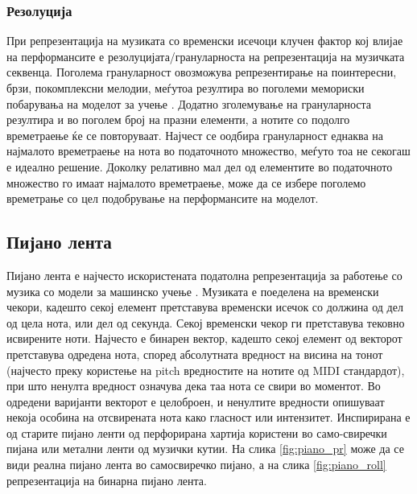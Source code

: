 \subsubsection{Резолуција}

При репрезентација на музиката со временски исечоци клучен фактор кој влијае на перформансите е резолуцијата/грануларноста на репрезентација на музичката секвенца. Поголема грануларност овозможува репрезентирање на поинтересни, брзи, покомплексни мелодии, меѓутоа резултира во поголеми мемориски побарувања на моделот за учење . Додатно зголемување на грануларноста резултира и во поголем број на празни елементи, а нотите со подолго времетраење ќе се повторуваат. Најчест се оодбира грануларност еднаква на најмалото времетраење на нота во податочното множество, меѓуто тоа не секогаш е идеално решение. Доколку релативно мал дел од елементите во податочното множество го имаат најмалото времетраење, може да се избере поголемо времетрање со цел подобрување на перформансите на моделот.

\subsection{Пијано лента}

Пијано лента е најчесто искористената податолна репрезентација за работење со музика со модели за машинско учење \cite{Hadjeres2016,Boulanger-Lewandowski2012,Boulanger-Lewandowski2014,Eck2002,Eck2008,Walder2016,Dong2017,Dong2018}. Музиката е поеделена на временски чекори, кадешто секој елемент претставува временски исечок со должина од дел од цела нота, или дел од секунда. Секој временски чекор ги претставува тековно исвирените ноти. Најчесто е бинарен вектор, кадешто секој елемент од векторот претставува одредена нота, според абсолутната вредност на висина на тонот (најчесто преку користење на pitch вредностите на нотите од MIDI стандардот), при што ненулта вредност означува дека таа нота се свири во моментот. Во одредени варијанти векторот е целоброен, и ненултите вредности опишуваат некоја особина на отсвирената нота како гласност или интензитет. Инспирирана е од старите пијано ленти од перфорирана хартија користени во само-свиречки пијана или метални ленти од музички кутии. На слика \ref{fig:piano_pr} може да се види реална пијано лента во самосвиречко пијано, а на слика \ref{fig:piano_roll} репрезентација на бинарна пијано лента.

